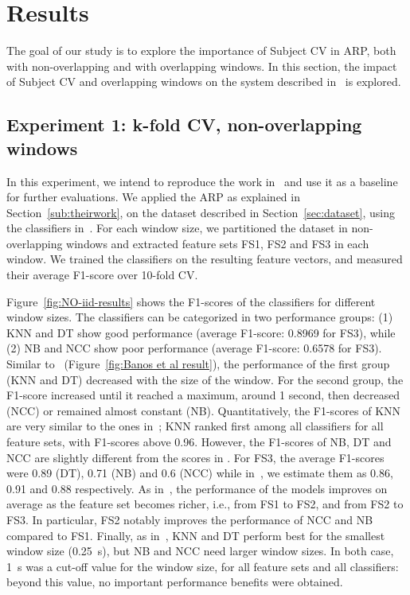 \documentclass[sigconf]{acmart}
\begin{document}
\section{Results} 
\label{sec:result}

The goal of our study is to explore the importance of Subject CV in ARP, both with non-overlapping and with overlapping windows. In this section, the impact of Subject CV and overlapping windows on the system described in~\cite{banos2014window} is explored.

\subsection{Experiment 1: k-fold CV, non-overlapping windows} \label{reproduce}

    In this experiment, we intend to reproduce the work in~\cite{banos2014window} and use it as a baseline
    for further evaluations. 
    We applied the ARP as explained in Section~\ref{sub:theirwork}, on the dataset described in Section~\ref{sec:dataset}, using the classifiers in~\cite{banos2014window}. For each window size, we partitioned the dataset in non-overlapping windows and extracted feature sets FS1, FS2 and FS3 in each window. We trained the classifiers on the resulting feature vectors, and measured their average F1-score over 10-fold CV.
    
    Figure~\ref{fig:NO-iid-results} shows the F1-scores of the classifiers for different window sizes. The classifiers can be categorized in two performance groups: (1) KNN and DT show good performance (average F1-score: 0.8969 for FS3), while (2) NB and NCC show poor performance (average F1-score: 0.6578 for FS3). Similar to~\cite{banos2014window} (Figure~\ref{fig:Banos et al result}), the performance of the first group (KNN and DT) decreased with the size of the window. For the second group, the F1-score increased until it reached a maximum, around 1 second, then decreased (NCC) or remained almost constant (NB). Quantitatively, the F1-scores of KNN are very similar to the ones in~\cite{banos2014window}; KNN ranked first among all classifiers for all feature sets, with F1-scores above 0.96. However, the F1-scores of NB, DT and NCC are slightly different from the scores in \cite{banos2014window}. For FS3, the average F1-scores were 0.89 (DT), 0.71 (NB) and 0.6 (NCC) while in~\cite{banos2014window}, we estimate them as 0.86, 0.91 and 0.88 respectively. As in~\cite{banos2014window}, the performance of the models improves on average as the feature set becomes richer, i.e., from FS1 to FS2, and from FS2 to FS3. In particular, FS2 notably improves the performance of NCC and NB compared to FS1. Finally, as in~\cite{banos2014window}, KNN and DT perform best for the smallest window size (0.25~s), but NB and NCC need larger window sizes. In both case, 1~s was a cut-off value for the window size, for all feature sets and all classifiers: beyond this value, no important performance benefits were obtained. 
\end{document}
